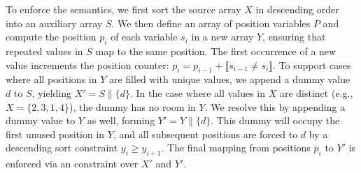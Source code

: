 To enforce the  semantics, we first sort the source array $X$ in descending order into an auxiliary array $S$. We then define an array of position variables $P$ and compute the position $p_i$ of each variable $s_i$ in a new array $Y$, ensuring that repeated values in $S$ map to the same position. The first occurrence of a new value increments the position counter: $p_i=p_{i-1}+ \llbracket s_{i-1} \neq s_i \rrbracket$.
To support cases where all positions in $Y$ are filled with unique values, we append a dummy value $d$ to $S$, yielding $X' = S \mathbin{\|} \{d\}$. In the case where all values in $X$ are distinct (e.g., $X = \{2,3,1,4\}$), the dummy has no room in $Y$. We resolve this by appending a dummy value to $Y$ as well, forming $Y' = Y \mathbin{\|} \{d\}$. This dummy will occupy the first unused position in $Y$, and all subsequent positions are forced to $d$ by a descending sort constraint $y_i \geq y_{i+1}$. The final mapping from positions $p_i$ to $Y'$ is enforced via an  constraint over $X'$ and $Y'$.



